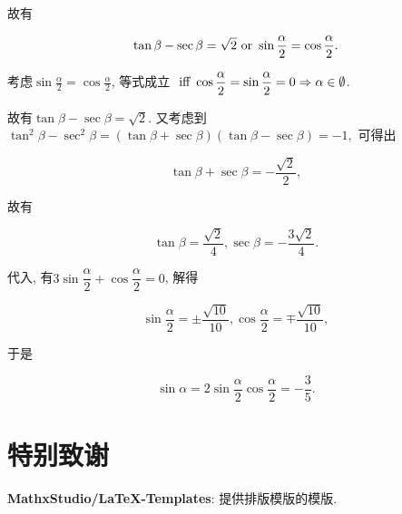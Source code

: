 \documentclass[8pt]{article}
\begin{document}
			故有

			$$\tan \beta - \sec \beta = \sqrt{2} \text{ or } \sin \frac{\alpha}{2} = \cos \frac{\alpha}{2}.$$

			考虑$\sin \frac{\alpha}{2} = \cos \frac{\alpha}{2}$, 等式成立 $\displaystyle \text{ iff } \cos \frac{\alpha}{2} = \sin \frac{\alpha}{2} = 0 \Rightarrow \alpha \in \emptyset$.

			故有$\tan \beta - \sec \beta = \sqrt{2}$. 又考虑到$\tan^2 \beta - \sec^2 \beta = (\tan \beta + \sec \beta)(\tan \beta - \sec \beta) = -1,$ 可得出

			$$\tan \beta + \sec \beta = -\dfrac{\sqrt{2}}{2},$$

			故有

			$$\tan \beta = \frac{\sqrt{2}}{4}, \sec \beta = -\frac{3\sqrt{2}}{4}.$$

			代入, 有$3\sin \dfrac{\alpha}{2} + \cos \dfrac{\alpha}{2}=0$, 解得

			$$\sin \frac{\alpha}{2} = \pm \frac{\sqrt{10}}{10}, \cos \frac{\alpha}{2} = \mp \frac{\sqrt{10}}{10},$$

			于是

			$$\sin \alpha = 2 \sin \frac{\alpha}{2} \cos \frac{\alpha}{2} = - \frac{3}{5}.$$

	\section{特别致谢}
		\textbf{\textcolor{allangreen}{MathxStudio/LaTeX-Templates}}: 提供排版模版的模版.
\end{document}
